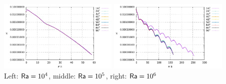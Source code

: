 \begin{center}
\includegraphics[width=5.7cm]{python_codes/fieldstone_110/results_EBA/conv_Ra1e5.pdf}
\includegraphics[width=5.7cm]{python_codes/fieldstone_110/results_EBA/conv_Ra1e6.pdf}\\
{\captionfont Left: ${\mathsf{Ra}}=10^4$, middle: ${\mathsf{Ra}}=10^5$, right: ${\mathsf{Ra}}=10^6$} 
\end{center}

